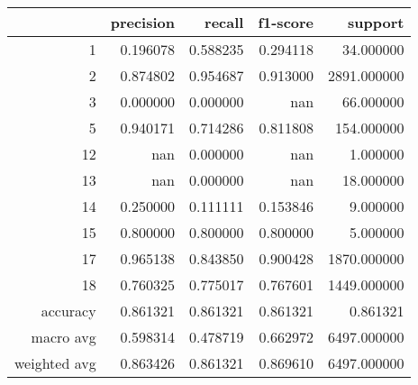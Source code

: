 \begin{tabular}{rrrrr}
\toprule
 & precision & recall & f1-score & support \\
\midrule
1 & 0.196078 & 0.588235 & 0.294118 & 34.000000 \\
2 & 0.874802 & 0.954687 & 0.913000 & 2891.000000 \\
3 & 0.000000 & 0.000000 & nan & 66.000000 \\
5 & 0.940171 & 0.714286 & 0.811808 & 154.000000 \\
12 & nan & 0.000000 & nan & 1.000000 \\
13 & nan & 0.000000 & nan & 18.000000 \\
14 & 0.250000 & 0.111111 & 0.153846 & 9.000000 \\
15 & 0.800000 & 0.800000 & 0.800000 & 5.000000 \\
17 & 0.965138 & 0.843850 & 0.900428 & 1870.000000 \\
18 & 0.760325 & 0.775017 & 0.767601 & 1449.000000 \\
accuracy & 0.861321 & 0.861321 & 0.861321 & 0.861321 \\
macro avg & 0.598314 & 0.478719 & 0.662972 & 6497.000000 \\
weighted avg & 0.863426 & 0.861321 & 0.869610 & 6497.000000 \\
\bottomrule
\end{tabular}
